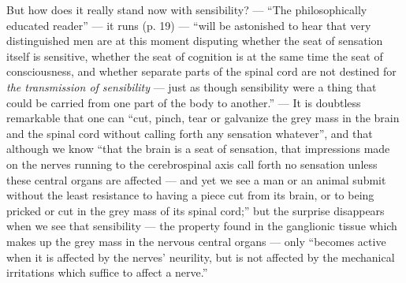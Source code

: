 \documentclass[12pt,a4paper]{book}
\begin{document}
But how does it really stand now with sensibility? --- ``The philosophically
educated reader'' --- it runs (p. 19) --- ``will be astonished to hear that very
distinguished men are at this moment disputing whether the seat of sensation itself
is sensitive, whether the seat of cognition is at the same time the seat of
consciousness, and whether separate parts of the spinal cord are not destined for
\emph{the transmission of sensibility} --- just as though sensibility were a thing
that could be carried from one part of the body to another.'' --- It is doubtless
remarkable that one can ``cut, pinch, tear or galvanize the grey mass in the brain
and the spinal cord without calling forth any sensation whatever'', and that
although we know ``that the brain is a seat of sensation, that impressions made on
the nerves running to the cerebrospinal axis call forth no sensation unless these
central organs are affected --- and yet we see a man or an animal submit without the
least resistance to having a piece cut from its brain, or to being pricked or cut in
the grey mass of its spinal cord;'' but the surprise disappears when we see that
sensibility --- the property found in the ganglionic tissue which makes up the grey
mass in the nervous central%
\setcounter{footnote}{0}%
organs --- only ``becomes active when it is affected by the nerves' neurility, but
is not affected by the mechanical irritations which suffice to affect a nerve.''
\end{document}
